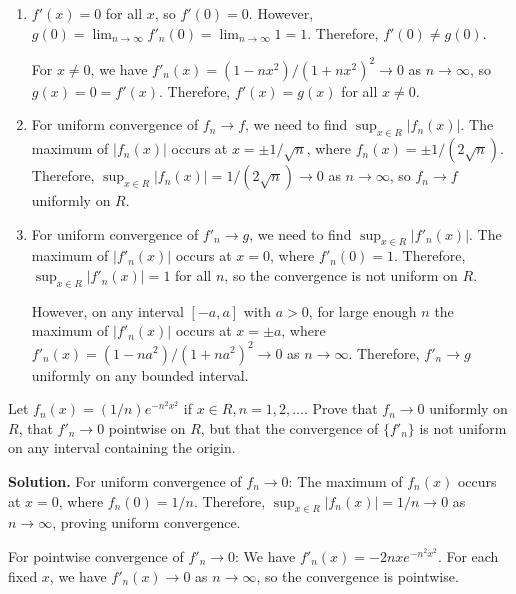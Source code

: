 \begin{enumerate}[label=(\alph*)]
\item \( f'(x) = 0 \) for all \( x \), so \( f'(0) = 0 \). However, \( g(0) = \lim_{n \to \infty} f'_n(0) = \lim_{n \to \infty} 1 = 1 \). Therefore, \( f'(0) \neq g(0) \).

For \( x \neq 0 \), we have \( f'_n(x) = (1 - nx^2)/(1 + nx^2)^2 \to 0 \) as \( n \to \infty \), so \( g(x) = 0 = f'(x) \). Therefore, \( f'(x) = g(x) \) for all \( x \neq 0 \).

\item For uniform convergence of \( f_n \to f \), we need to find \( \sup_{x \in R} |f_n(x)| \). The maximum of \( |f_n(x)| \) occurs at \( x = \pm 1/\sqrt{n} \), where \( f_n(x) = \pm 1/(2\sqrt{n}) \). Therefore, \( \sup_{x \in R} |f_n(x)| = 1/(2\sqrt{n}) \to 0 \) as \( n \to \infty \), so \( f_n \to f \) uniformly on \( R \).

\item For uniform convergence of \( f'_n \to g \), we need to find \( \sup_{x \in R} |f'_n(x)| \). The maximum of \( |f'_n(x)| \) occurs at \( x = 0 \), where \( f'_n(0) = 1 \). Therefore, \( \sup_{x \in R} |f'_n(x)| = 1 \) for all \( n \), so the convergence is not uniform on \( R \).

However, on any interval \([-a, a]\) with \( a > 0 \), for large enough \( n \) the maximum of \( |f'_n(x)| \) occurs at \( x = \pm a \), where \( f'_n(x) = (1 - na^2)/(1 + na^2)^2 \to 0 \) as \( n \to \infty \). Therefore, \( f'_n \to g \) uniformly on any bounded interval.
\end{enumerate}

\begin{problembox}
Let \( f_n(x) = (1/n)e^{-n^2x^2} \) if \( x \in R, n = 1, 2, \ldots \). Prove that \( f_n \to 0 \) uniformly on \( R \), that \( f'_n \to 0 \) pointwise on \( R \), but that the convergence of \(\{f'_n\}\) is not uniform on any interval containing the origin.
\end{problembox}

\noindent\textbf{Solution.} For uniform convergence of \( f_n \to 0 \): The maximum of \( f_n(x) \) occurs at \( x = 0 \), where \( f_n(0) = 1/n \). Therefore, \( \sup_{x \in R} |f_n(x)| = 1/n \to 0 \) as \( n \to \infty \), proving uniform convergence.

For pointwise convergence of \( f'_n \to 0 \): We have \( f'_n(x) = -2nxe^{-n^2x^2} \). For each fixed \( x \), we have \( f'_n(x) \to 0 \) as \( n \to \infty \), so the convergence is pointwise.

